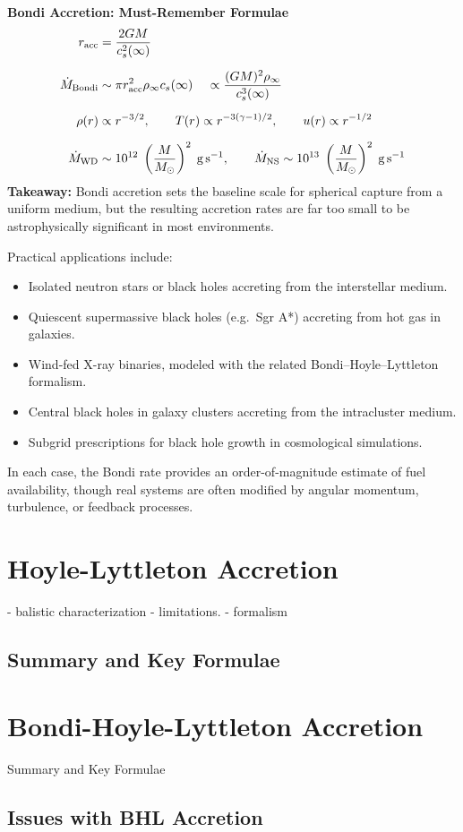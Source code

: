 \begin{bigidea}
\textbf{Bondi Accretion: Must-Remember Formulae}
\begin{align*}
r_{\rm acc} &= \frac{2GM}{c_s^2(\infty)} \\[6pt]
\dot{M}_{\rm Bondi} &\sim \pi r_{\rm acc}^2 \rho_\infty c_s(\infty) \;\;\;\; \propto \frac{(GM)^2 \rho_\infty}{c_s^3(\infty)} \\[6pt]
\rho(r) &\propto r^{-3/2}, \qquad T(r) \propto r^{-3(\gamma-1)/2}, \qquad u(r) \propto r^{-1/2} \\[6pt]
\dot{M}_{\rm WD} &\sim 10^{12} \;\left(\frac{M}{M_\odot}\right)^2\;{\rm g\,s^{-1}}, \qquad
\dot{M}_{\rm NS} \sim 10^{13} \;\left(\frac{M}{M_\odot}\right)^2\;{\rm g\,s^{-1}}
\end{align*}
\textbf{Takeaway:} Bondi accretion sets the baseline scale for spherical capture from a uniform medium, but the resulting accretion rates are far too small to be astrophysically significant in most environments.
\end{bigidea}

\begin{conceptbox}

Practical applications include:
\begin{itemize}
    \item Isolated neutron stars or black holes accreting from the interstellar medium.
    \item Quiescent supermassive black holes (e.g.\ Sgr A*) accreting from hot gas in galaxies.
    \item Wind-fed X-ray binaries, modeled with the related Bondi--Hoyle--Lyttleton formalism.
    \item Central black holes in galaxy clusters accreting from the intracluster medium.
    \item Subgrid prescriptions for black hole growth in cosmological simulations.
\end{itemize}
In each case, the Bondi rate provides an order-of-magnitude estimate of fuel availability, 
though real systems are often modified by angular momentum, turbulence, or feedback processes.
\end{conceptbox}

\section{Hoyle-Lyttleton Accretion}

- balistic characterization
- limitations.
- formalism

\subsection*{Summary and Key Formulae}

\section{Bondi-Hoyle-Lyttleton Accretion}

Summary and Key Formulae

\subsection{Issues with BHL Accretion}
